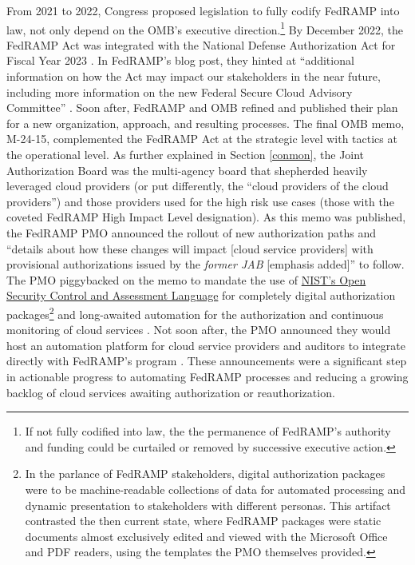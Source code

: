 \documentclass{jdf}
\begin{document}
From 2021 to 2022, Congress proposed legislation to fully codify FedRAMP into law, not only depend on the OMB's executive direction.\footnote{If not fully codified into law, the the permanence of FedRAMP's authority and funding could be curtailed or removed by successive executive action.} By December 2022, the FedRAMP Act was integrated with the National Defense Authorization Act for Fiscal Year 2023 \cite{ndaa2023}. In FedRAMP's blog post, they hinted at ``additional information on how the Act may impact our stakeholders in the near future, including more information on the new Federal Secure Cloud Advisory Committee'' \citeyear{fedramp_blog_ndaa2023}. Soon after, FedRAMP and OMB refined and published their plan for a new organization, approach, and resulting processes. The final OMB memo, M-24-15, complemented the FedRAMP Act at the strategic level with tactics at the operational level. As further explained in Section \ref{conmon}, the Joint Authorization Board was the multi-agency board that shepherded heavily leveraged cloud providers (or put differently, the ``cloud providers of the cloud providers'') and those providers used for the high risk use cases (those with the coveted FedRAMP High Impact Level designation). As this memo was published, the FedRAMP PMO announced the rollout of new authorization paths and ``details about how these changes will impact [cloud service providers] with provisional authorizations issued by the \textit{former JAB} [emphasis added]'' \citeyear{fedramp_blog_phase24} to follow. The PMO piggybacked on the memo to mandate the use of \href{https://pages.nist.gov/OSCAL}{NIST's Open Security Control and Assessment Language} for completely digital authorization packages\footnote{In the parlance of FedRAMP stakeholders, digital authorization packages were to be machine-readable collections of data for automated processing and dynamic presentation to stakeholders with different personas. This artifact contrasted the then current state, where FedRAMP packages were static documents almost exclusively edited and viewed with the Microsoft Office and PDF readers, using the templates the PMO themselves provided.} and long-awaited automation for the authorization and continuous monitoring of cloud services \citeyear{fedramp_blog_phase24}. Not soon after, the PMO announced they would host an automation platform for cloud service providers and auditors to integrate directly with FedRAMP's program \citeyear{fedramp_blog_platform24}. These announcements were a significant step in actionable progress to automating FedRAMP processes and reducing a growing backlog of cloud services awaiting authorization or reauthorization.
\end{document}
